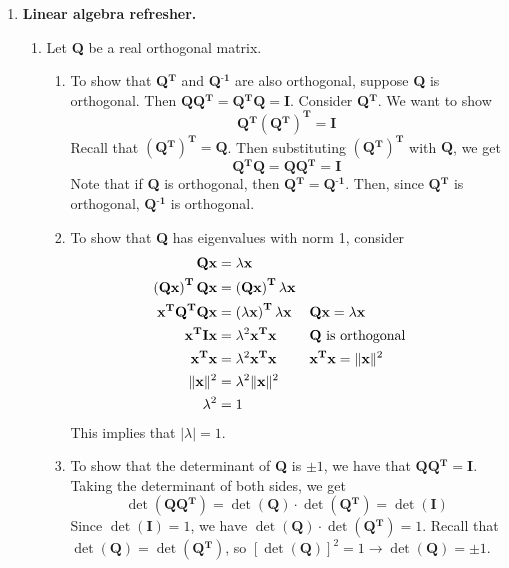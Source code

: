 \documentclass [12pt] {article}
\renewcommand{\bf}[1]{\textbf{{#1}}}
\begin{document}
\begin{enumerate}
    \item \bf{Linear algebra refresher.}
        \begin{enumerate}
            \item 
                \newcommand{\QT}{\bf{Q$^{\bf{T}}$}}
                \newcommand{\QI}{\bf{Q$^{\bf{-1}}$}}
                \newcommand{\QQ}{\bf{Q}}
                Let \QQ {} be a real orthogonal matrix.
                \begin{enumerate}
                    \item To show that \QT {} and \QI {} are also orthogonal, suppose \QQ {} is 
                        orthogonal. Then $\QQ \QT = \QT \QQ = \bf{I}$. Consider \QT. We
                        want to show \[\QT \left(\QT\right)^{\bf{T}} = \bf{I}\]
                        Recall that $\left(\QT\right)^{\bf{T}} = \QQ$. Then substituting 
                        $\left(\QT\right)^{\bf{T}}$ with $\QQ$, we get 
                        \[\QT \QQ = \QQ \QT = \bf{I}\]
                        Note that if \QQ {} is orthogonal, then $\QT = \QI$. Then, since $\QT$ is 
                        orthogonal, $\QI$ is orthogonal.

                    \item To show that \QQ {} has eigenvalues with norm 1, consider
                        \newcommand{\x}{\bf{x}}
                        \newcommand{\T}{\bf{T}}
                        \begin{align*}
                            \QQ \x &= \lambda \x \\
                            \left( \QQ \x \right)^{\T} \QQ \x &= \left( \QQ \x \right)^{\T} \lambda \x \\
                            \x^{\T} \QQ^{\T} \QQ \x &= \left( \lambda \x \right)^{\T} \lambda \x && \QQ \x = \lambda \x \\
                            \x^{\T} \bf{I} \x &= \lambda^2 \x^{\T} \x && \text{\QQ {} is orthogonal} \\
                            \x^{\T} \x &= \lambda^2 \x^{\T} \x && \x^{\T} \x = \|\x\|^2 \\
                            \|\x\|^2 &= \lambda^2 \|\x\|^2 \\
                            \lambda^2 &= 1
                        \end{align*}
                        This implies that $|\lambda| = 1$.

                    \item To show that the determinant of \QQ {} is $\pm 1$, we have that
                        $\QQ \QT = \bf{I}$. Taking the determinant of both sides, we get
                        \[\det \left( \QQ \QT \right) = \det \left( \QQ \right) \cdot 
                        \det \left( \QT \right) = \det \left( \bf{I} \right)\]
                        Since $\det \left( \bf{I} \right) = 1$, we have
                        $\det \left( \QQ \right) \cdot \det \left( \QT \right) = 1$. Recall that
                        $\det \left( \QQ \right) = \det \left( \QT \right)$, so
                        $\left[\det \left( \QQ \right)\right]^2 = 1 \to \det \left( \QQ \right) = \pm 1$.


\end{enumerate}
\end{enumerate}
\end{enumerate}
\end{document}
